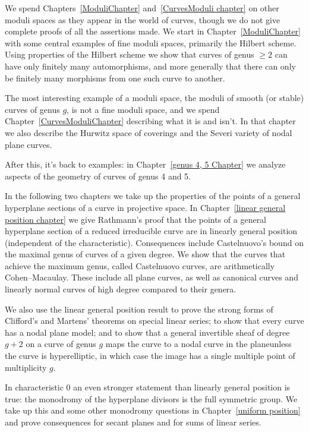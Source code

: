 We spend Chapters~\ref{ModuliChapter} and~\ref{CurvesModuli chapter} on other moduli spaces as they appear in the world of curves, though we do not give complete proofs of all the assertions made. We start in Chapter~\ref{ModuliChapter} with some central examples of fine moduli spaces, primarily
the Hilbert scheme. Using properties of the Hilbert scheme we show that curves of genus $\geq 2$
can have only finitely many automorphisms, and more generally that there can only be finitely
many morphisms from one such curve to another.

The most interesting example of a moduli space, the moduli of smooth (or stable) curves of genus $g$, is not a fine moduli space, and we spend Chapter~\ref{CurvesModuliChapter} describing what it is and isn't. In that chapter we also describe the Hurwitz space of coverings and the Severi variety of nodal plane curves.

After this, it's back to examples: in Chapter~\ref{genus 4, 5 Chapter} we analyze aspects of the geometry of curves of genus 4 and 5.  

In the following two chapters we take up 
the properties of the points of a general hyperplane sections of a curve in projective space. 
In Chapter~\ref{linear general position chapter} we give Rathmann's proof that
the points of a general hyperplane section of a reduced irreducible curve are in linearly general position (independent of the characteristic).
Consequences include Castelnuovo's bound  on the maximal genus of curves of a given degree.
We show that the curves that achieve the maximum genus, called Castelnuovo curves,
are arithmetically Cohen--Macaulay. These include all plane curves, as well as
canonical curves and linearly normal curves of high degree compared to their genera. 

We also
use the linear general position result to prove the strong forms of Clifford's and Martens' theorems
on special linear series; to show that every curve has a nodal plane model; and to show that a 
general invertible sheaf  of degree $g+2$ on a curve of genus $g$  maps the curve to a nodal curve
in the plane\emdash unless the curve is hyperelliptic, in which case the image has a single multiple point of
multiplicity $g$.

In characteristic 0 an even stronger statement than linearly general position is true: the monodromy of the hyperplane divisors is the full symmetric group. We take up this
and some other monodromy questions in Chapter~\ref{uniform position} and prove consequences
for secant planes and for sums of linear series.


